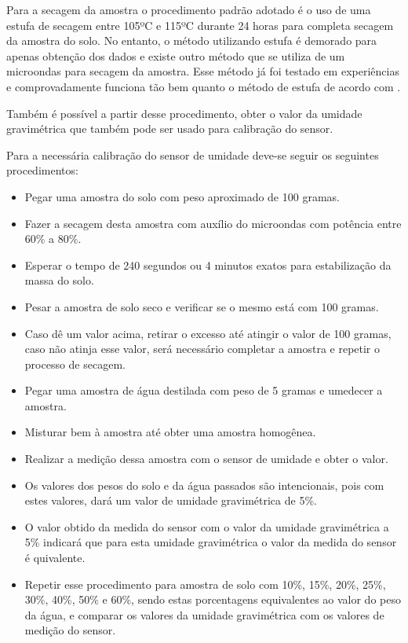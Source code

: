 \begin{itemize}
  Para a secagem da amostra o procedimento padrão adotado é o uso de uma estufa de secagem entre 105ºC e 115ºC durante 24 horas para completa secagem da amostra do solo. No entanto, o método utilizando estufa é demorado para apenas obtenção dos dados e existe outro método que se utiliza de um microondas para secagem da amostra. Esse método já foi testado em experiências e comprovadamente funciona tão bem quanto o método de estufa de acordo com .
  
  Também é possível a partir desse procedimento, obter o valor da umidade gravimétrica que também pode ser usado para calibração do sensor.
  
  Para a necessária calibração do sensor de umidade deve-se seguir os seguintes procedimentos:
  
  \begin{itemize}
  	\item Pegar uma amostra do solo com peso aproximado de 100 gramas.
  	\item Fazer a secagem desta amostra com auxílio do microondas com potência entre 60\% a 80\%.
  	\item Esperar o tempo de 240 segundos ou 4 minutos exatos para estabilização da massa do solo.
  	\item Pesar a amostra de solo seco e verificar se o mesmo está com 100 gramas.
  	\item Caso dê um valor acima, retirar o excesso até atingir o valor de 100 gramas, caso não atinja esse valor, será necessário completar a amostra e repetir o processo de secagem.
  	\item Pegar uma amostra de água destilada com peso de 5 gramas e umedecer a amostra.
  	\item Misturar bem à amostra até obter uma amostra homogênea.
  	\item Realizar a medição dessa amostra com o sensor de umidade e obter o valor.
  	\item Os valores dos pesos do solo e da água passados são intencionais, pois com estes valores, dará um valor de umidade gravimétrica de 5\%.
  	\item O valor obtido da medida do sensor com o valor da umidade gravimétrica a 5\% indicará que para esta umidade gravimétrica o valor da medida do sensor é quivalente.
  	\item Repetir esse procedimento para amostra de solo com 10\%, 15\%, 20\%, 25\%, 30\%, 40\%, 50\% e 60\%, sendo estas porcentagens equivalentes ao valor do peso da água, e comparar os valores da umidade gravimétrica com os valores de medição do sensor.
  \end{itemize}
  

\end{itemize}
